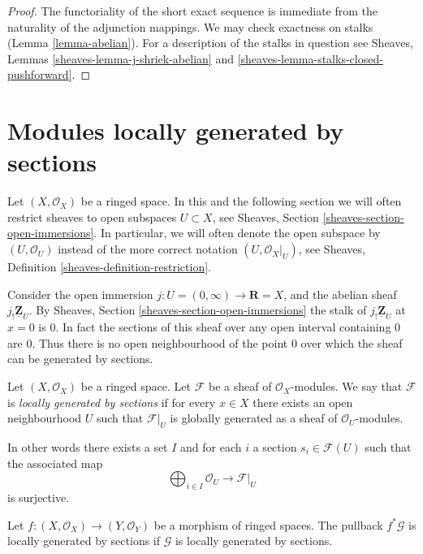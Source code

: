 \begin{proof}
The functoriality of the short exact sequence is
immediate from the naturality of the adjunction mappings.
We may check exactness on stalks (Lemma \ref{lemma-abelian}).
For a description of the stalks in question see
Sheaves, Lemmas \ref{sheaves-lemma-j-shriek-abelian}
and \ref{sheaves-lemma-stalks-closed-pushforward}.
\end{proof}








\section{Modules locally generated by sections}
\label{section-locally-generated}

\noindent
Let $(X, \mathcal{O}_X)$ be a ringed space.
In this and the following section we will often restrict
sheaves to open subspaces $U \subset X$, see
Sheaves, Section \ref{sheaves-section-open-immersions}.
In particular, we will often denote the open subspace
by $(U, \mathcal{O}_U)$ instead of the more correct
notation $(U, \mathcal{O}_X|_U)$, see
Sheaves, Definition \ref{sheaves-definition-restriction}.

\medskip\noindent
Consider the open immersion
$j : U = (0 , \infty) \to \mathbf{R} = X$, and the abelian sheaf
$j_!\underline{\mathbf{Z}}_U$. By Sheaves, Section
\ref{sheaves-section-open-immersions} the stalk of
$j_!\underline{\mathbf{Z}}_U$ at $x = 0$ is $0$. In fact the
sections of this sheaf over any open interval containing $0$
are $0$. Thus there is no open neighbourhood of the point
$0$ over which the sheaf can be generated by sections.

\begin{definition}
\label{definition-locally-generated}
Let $(X, \mathcal{O}_X)$ be a ringed space.
Let $\mathcal{F}$ be a sheaf of $\mathcal{O}_X$-modules.
We say that $\mathcal{F}$ is {\it locally generated by sections}
if for every $x \in X$ there exists an open
neighbourhood $U$ such that $\mathcal{F}|_U$
is globally generated as a sheaf of $\mathcal{O}_U$-modules.
\end{definition}

\noindent
In other words there exists a set $I$ and for
each $i$ a section $s_i \in \mathcal{F}(U)$ such
that the associated map
$$
\bigoplus\nolimits_{i \in I} \mathcal{O}_U
\longrightarrow
\mathcal{F}|_U
$$
is surjective.

\begin{lemma}
\label{lemma-pullback-locally-generated}
Let $f : (X, \mathcal{O}_X) \to (Y, \mathcal{O}_Y)$
be a morphism of ringed spaces.
The pullback $f^*\mathcal{G}$ is locally generated by sections
if $\mathcal{G}$ is locally generated by sections.
\end{lemma}

